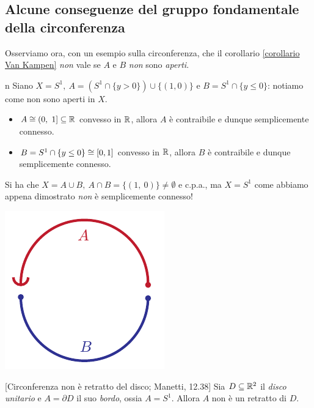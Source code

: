 \subsection{Alcune conseguenze del gruppo fondamentale della circonferenza}
Osserviamo ora, con un esempio sulla circonferenza, che il corollario \ref{corollario Van Kampen} \textit{non} vale se $A$ e $B$ \textit{non} sono \textit{aperti}.
\begin{example}{n}
	Siano $X=S^1,\ A=(S^1\cap\{y>0\})\cup \{(1,0)\}$ e $B=S^1\cap\{y\leq 0\}$: notiamo come non sono aperti in $X$.\\
\begin{minipage}{.81\linewidth}
\begin{itemize}
	\item $A\cong (0,\ 1]\subseteq \mathbb{R}$ convesso in $\mathbb{R}$, allora $A$ è contraibile e dunque semplicemente connesso.
	\item $B=S^1\cap\{y\leq 0\}\cong\left[0, 1\right]$ convesso in $\mathbb{R}$, allora $B$ è contraibile e dunque semplicemente connesso.
\end{itemize}
Si ha che $X=A\cup B,\ A\cap B=\{(1,\ 0)\}\neq\emptyset$ e c.p.a., ma $X=S^1$ come abbiamo appena dimostrato \textit{non} è semplicemente connesso!
	\end{minipage}
	\begin{minipage}{.18\linewidth}\vspace{-6mm}
		\includegraphics[trim=0cm 0cm 0cm 0cm,clip,scale=0.6]{images/notvankampen.pdf}
	\end{minipage}
\end{example}
\begin{corollary}{}[Circonferenza non è retratto del disco; Manetti, 12.38]\label{circonferenza non retratto disco}
Sia $D\subseteq\mathbb{R}^2$ il \textit{disco unitario} e $A=\partial{D}$ il suo \textit{bordo}, ossia $A=S^1$. Allora $A$ non è un retratto di $D$.
\end{corollary}
